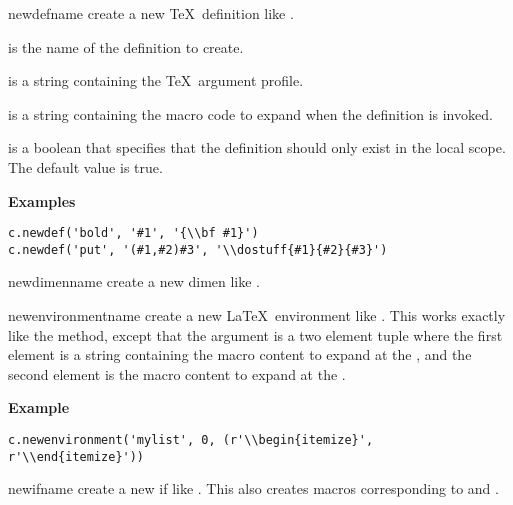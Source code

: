 \begin{methoddesc}[Context]{newdef}{name}
create a new \TeX\ definition like .

 is the name of the definition to create.

 is a string containing the \TeX\ argument profile.

 is a string containing the macro code to expand when the
definition is invoked.

 is a boolean that specifies that the definition should only
exist in the local scope.  The default value is true.

\textbf{Examples}
\begin{verbatim}
c.newdef('bold', '#1', '{\\bf #1}')
c.newdef('put', '(#1,#2)#3', '\\dostuff{#1}{#2}{#3}')
\end{verbatim}
\end{methoddesc}

\begin{methoddesc}[Context]{newdimen}{name}
create a new dimen like .
\end{methoddesc}

\begin{methoddesc}[Context]{newenvironment}{name}
create a new \LaTeX\ environment like .  This works
exactly like the  method, except that the
 argument is a two element tuple where the first element
is a string containing the macro content to expand at the ,
and the second element is the macro content to expand at the .

\textbf{Example}
\begin{verbatim}
c.newenvironment('mylist', 0, (r'\\begin{itemize}', r'\\end{itemize}'))
\end{verbatim}
\end{methoddesc}

\begin{methoddesc}[Context]{newif}{name}
create a new if like .  This also creates macros corresponding
to  and .
\end{methoddesc}

